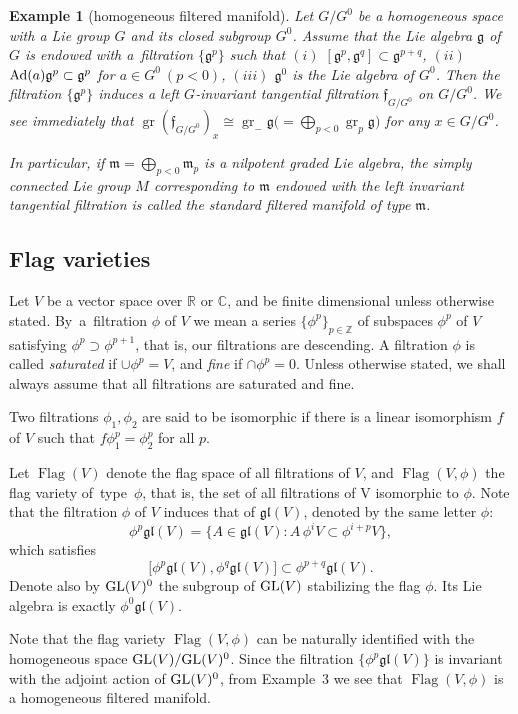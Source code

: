 \documentclass[pdftex]{sigma}%
\newcommand{\R}{\mathbb R}
\newcommand{\Z}{\mathbb Z}
\newcommand{\C}{\mathbb C}
\newcommand{\f}{\mathfrak f}
\newcommand{\g}{\mathfrak g}
\newcommand{\gl}{\mathfrak{gl}}
\newcommand{\m}{\mathfrak m}
\newcommand{\Flag}{\operatorname{Flag}}
\newcommand{\gr}{\operatorname{gr}}
\newtheorem{ex}[thm]{Example}
\numberwithin{equation}{section}
\begin{document}
\begin{ex} [homogeneous filtered manifold]
Let $G/G^0$ be a homogeneous space with a Lie group $G$ and its closed subgroup $G^0$.
Assume that the Lie algebra $\g$ of $G$ is endowed with a~filtration $\{ \g^p\}$
such that $(i)$ $[\g^p,\g^q]\subset \g^{p+q}$, $(ii)$ ${\rm Ad}(a)\g^p\subset \g^p$ for
$a\in G^0\ (p<0)$, $(iii)$ $\g^0$ is the Lie algebra of $G^0$.
Then the filtration $\{ \g^p\}$ induces a left $G$-invariant tangential filtration
$\f_{G/G^0}$ on $G/G^0$.
We see immediately that $\gr(\f_{G/G^0})_x\cong \gr_-\g \big({}=\bigoplus_{p<0}\gr_p\g\big)$
for any $x\in G/G^0$.

In particular, if $\m=\bigoplus_{p<0} \m_p$ is a nilpotent graded Lie algebra,
the simply connected Lie group $M$ corresponding to $\m$ endowed with the
left invariant tangential filtration is called the \emph{standard filtered manifold of type $\m$}.
\end{ex}

\subsection{Flag varieties}

Let $V$ be a vector space over $\R$ or $\C$, and be finite dimensional
unless otherwise stated.
By~a~fil\-t\-ration $\phi$ of $V$ we mean a series $\{ \phi ^p\} _{p \in \Z} $ of
subspaces $ \phi^p$ of $V$ satisfying $\phi^p \supset \phi^{p+1} $, that is, our filtrations are descending. A filtration $\phi$ is called \emph{saturated} if $\cup \phi^p = V$,
and \emph{fine} if $\cap \phi^p = 0$.
Unless otherwise stated, we shall always assume that all filtrations are saturated and fine.

Two filtrations $\phi_1, \phi_2$ are said to be isomorphic if
there is a linear isomorphism $f$ of $V$ such that
$f\phi_1^p = \phi_2^p $ for all $p$.

Let $\Flag(V) $ denote the flag space of all filtrations of $V$, and $\Flag(V, \phi)$ the flag variety of~type~$\phi$, that is, the set of all filtrations of V isomorphic to $\phi$. Note that the filtration $\phi$ of $V$ induces that of $\gl(V)$, denoted by the same letter $\phi$:
\[
\phi^p\gl(V) = \big\{ A \in \gl(V) \colon A\,\phi^iV \subset \phi^{i+p} V \big\},
\]
which satisfies
\[
\big[ \phi^p\gl(V), \phi^q\gl(V) \big] \subset \phi^{p+q}\gl(V).
\]
Denote also by ${\rm GL}(V)^0$ the subgroup of ${\rm GL}(V)$ stabilizing the flag $\phi$. Its Lie algebra is exactly $\phi^0\gl(V)$.

Note that the flag variety $\Flag(V,\phi)$ can be naturally identified with the homogeneous space ${\rm GL}(V)/{\rm GL}(V)^0$. Since the filtration $\{\phi^p\gl(V)\}$ is invariant with the adjoint action of ${\rm GL}(V)^0$, from Example~3 we see that $\Flag(V,\phi)$ is a homogeneous filtered manifold.
\end{document}
